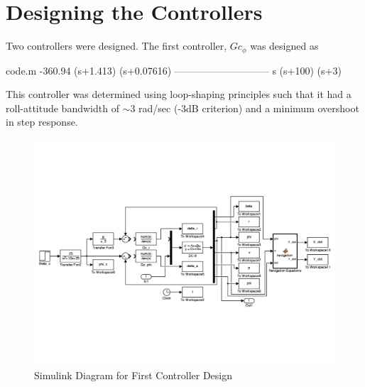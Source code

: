 \documentclass[12pt]{article}
\begin{document}
\section{Designing the Controllers}
Two controllers were designed. The first controller, $Gc_{\phi}$ was designed as
\begin{filecontents*}{code.m}
  -360.94 (s+1.413) (s+0.07616)
  -----------------------------
         s (s+100) (s+3)
\end{filecontents*}


\noindent This controller was determined using loop-shaping principles such that it had a roll-attitude bandwidth of $\sim$3 rad/sec (-3dB criterion) and a minimum overshoot in step response. \\

\begin{figure}[h!]
\begin{center}
\includegraphics[height=.425\textheight]{figures/first_controller_simulink}
\caption{Simulink Diagram for First Controller Design}
\end{center}
\end{figure}
\end{document}
